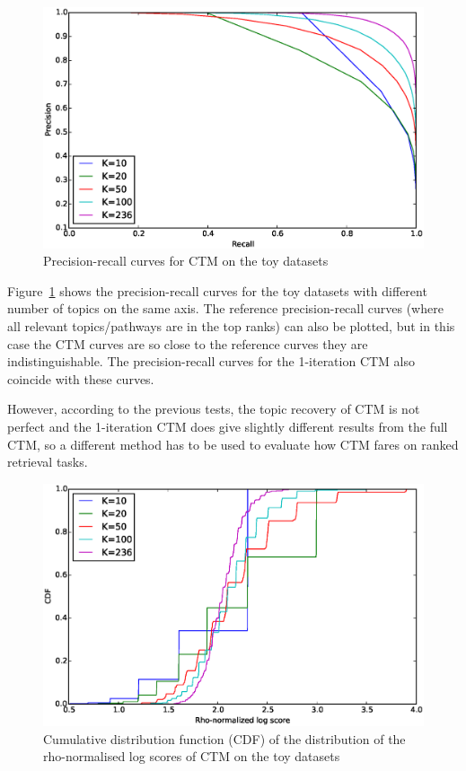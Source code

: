 \documentclass[12pt,a4paper,twoside,openright]{report}
\begin{document}
\begin{figure}[!htb]
\includegraphics[width=\textwidth]{sim-pr-curves-all.eps}
\caption{Precision-recall curves for CTM on the toy datasets}
\label{fig:sim-pr-curves-all}
\end{figure}

Figure~\ref{fig:sim-pr-curves-all} shows the precision-recall curves for the toy datasets with different number of topics on the same axis. The reference precision-recall curves (where all relevant topics/pathways are in the top ranks) can also be plotted, but in this case the CTM curves are so close to the reference curves they are indistinguishable. The precision-recall curves for the 1-iteration CTM also coincide with these curves.

However, according to the previous tests, the topic recovery of CTM is not perfect and the 1-iteration CTM does give slightly different results from the full CTM, so a different method has to be used to evaluate how CTM fares on ranked retrieval tasks.

\begin{figure}[!htb]
\includegraphics[width=\textwidth]{sim-log.eps}
\caption{Cumulative distribution function (CDF) of the distribution of the rho-normalised log scores of CTM on the toy datasets}
\label{fig:sim-log}
\end{figure}
\end{document}
